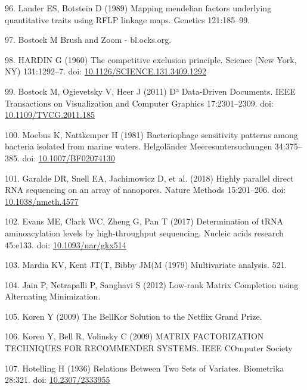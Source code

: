 \documentclass[12pt,twoside]{mitthesis-manusdown}
\begin{document}
\hypertarget{ref-Lander1989}{}
96. Lander ES, Botstein D (1989) Mapping mendelian factors underlying
quantitative traits using RFLP linkage maps. Genetics 121:185--99.

\hypertarget{ref-Bostock}{}
97. Bostock M Brush and Zoom - bl.ocks.org.

\hypertarget{ref-HARDIN1960}{}
98. HARDIN G (1960) The competitive exclusion principle. Science (New
York, NY) 131:1292--7. doi:
\href{https://doi.org/10.1126/SCIENCE.131.3409.1292}{10.1126/SCIENCE.131.3409.1292}

\hypertarget{ref-Bostock2011}{}
99. Bostock M, Ogievetsky V, Heer J (2011) D³ Data-Driven Documents.
IEEE Transactions on Visualization and Computer Graphics 17:2301--2309.
doi: \href{https://doi.org/10.1109/TVCG.2011.185}{10.1109/TVCG.2011.185}

\hypertarget{ref-Moebus1981}{}
100. Moebus K, Nattkemper H (1981) Bacteriophage sensitivity patterns
among bacteria isolated from marine waters. Helgoländer
Meeresuntersuchungen 34:375--385. doi:
\href{https://doi.org/10.1007/BF02074130}{10.1007/BF02074130}

\hypertarget{ref-Garalde2018}{}
101. Garalde DR, Snell EA, Jachimowicz D, et al. (2018) Highly parallel
direct RNA sequencing on an array of nanopores. Nature Methods
15:201--206. doi:
\href{https://doi.org/10.1038/nmeth.4577}{10.1038/nmeth.4577}

\hypertarget{ref-Evans2017}{}
102. Evans ME, Clark WC, Zheng G, Pan T (2017) Determination of tRNA
aminoacylation levels by high-throughput sequencing. Nucleic acids
research 45:e133. doi:
\href{https://doi.org/10.1093/nar/gkx514}{10.1093/nar/gkx514}

\hypertarget{ref-Mardia1979}{}
103. Mardia KV, Kent JT(T, Bibby JM(M (1979) Multivariate analysis. 521.

\hypertarget{ref-Jain2012}{}
104. Jain P, Netrapalli P, Sanghavi S (2012) Low-rank Matrix Completion
using Alternating Minimization.

\hypertarget{ref-Koren2009a}{}
105. Koren Y (2009) The BellKor Solution to the Netflix Grand Prize.

\hypertarget{ref-Koren2009}{}
106. Koren Y, Bell R, Volinsky C (2009) MATRIX FACTORIZATION TECHNIQUES
FOR RECOMMENDER SYSTEMS. IEEE COmputer Society

\hypertarget{ref-Hotelling1936}{}
107. Hotelling H (1936) Relations Between Two Sets of Variates.
Biometrika 28:321. doi:
\href{https://doi.org/10.2307/2333955}{10.2307/2333955}
\end{document}
